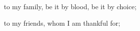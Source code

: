 \begin{agradecimentos}



to my family, be it by blood, be it by choice;\par
to my friends, whom I am thankful for;\par






\end{agradecimentos}